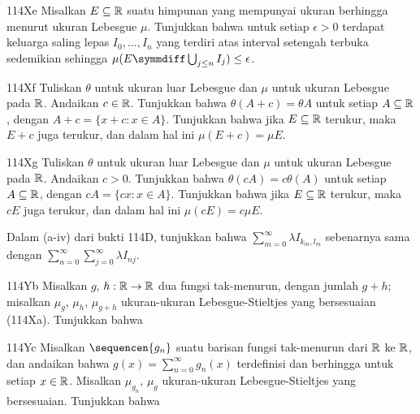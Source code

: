 {\spheader 114Xe Misalkan $E\subseteq\Bbb R$ suatu himpunan yang
mempunyai ukuran berhingga menurut ukuran Lebesgue $\mu$. Tunjukkan
bahwa untuk setiap
$\epsilon>0$ terdapat keluarga saling lepas $I_0,\ldots,I_n$ yang
terdiri atas interval setengah terbuka sedemikian sehingga
$\mu(E\symmdiff\bigcup_{j\le n}I_j)\le\epsilon$. 

\sqheader 114Xf Tuliskan $\theta$ untuk ukuran luar Lebesgue dan $\mu$
untuk ukuran Lebesgue pada $\Bbb R$. Andaikan $c\in\Bbb R$. Tunjukkan
bahwa $\theta(A+c)=\theta A$ untuk setiap $A\subseteq\Bbb R$, dengan
$A+c=\{x+c:x\in A\}$. Tunjukkan bahwa jika
$E\subseteq \Bbb R$ terukur, maka $E+c$ juga terukur, dan dalam hal ini
$\mu(E+c)=\mu E$.

\spheader 114Xg Tuliskan $\theta$ untuk ukuran luar Lebesgue dan $\mu$
untuk ukuran Lebesgue pada $\Bbb R$. Andaikan $c>0$. Tunjukkan bahwa
$\theta(cA)=c\theta(A)$ untuk setiap $A\subseteq\Bbb R$, dengan
$cA=\{cx:x\in A\}$.
Tunjukkan bahwa jika $E\subseteq \Bbb R$ terukur, maka $cE$ juga
terukur, dan dalam hal ini $\mu(cE)=c\mu E$.

Dalam (a-iv) dari bukti 114D, tunjukkan bahwa
$\sum_{m=0}^{\infty}\lambda I_{k_m,l_m}$ sebenarnya sama dengan
$\sum_{n=0}^{\infty}\sum_{j=0}^{\infty}\lambda I_{nj}$.

\spheader 114Yb Misalkan $g$, $h:\Bbb R\to\Bbb R$ dua fungsi
tak-menurun, dengan jumlah $g+h$; misalkan
$\mu_g$, $\mu_h$, $\mu_{g+h}$ ukuran-ukuran Lebesgue-Stieltjes yang
bersesuaian (114Xa). Tunjukkan bahwa

\spheader 114Yc Misalkan $\sequencen{g_n}$ suatu barisan fungsi
tak-menurun dari $\Bbb R$ ke $\Bbb R$, dan andaikan bahwa
$g(x)=\sum_{n=0}^{\infty}g_n(x)$ terdefinisi dan berhingga untuk setiap
$x\in\Bbb R$. Misalkan $\mu_{g_n}$, $\mu_g$ ukuran-ukuran
Lebesgue-Stieltjes yang bersesuaian. Tunjukkan bahwa


}
